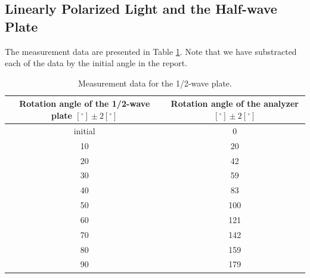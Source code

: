 \documentclass[a4paper]{article}
\begin{document}
\subsection{Linearly Polarized Light and the Half-wave Plate}

The measurement data are presented in Table \ref{table::1/2}. Note that we have substracted each of the data by the initial angle in the report.

\begin{table}[H]
	\centering
	\begin{tabular}{cc}
		\hline
		Rotation angle of the 1/2-wave plate $[^\circ] \pm 2[^\circ]$ & Rotation angle of the analyzer $[^\circ] \pm 2[^\circ]$ \\
		\hline
		initial                                                       & 0                                                       \\
		10                                                            & 20                                                      \\
		20                                                            & 42                                                      \\
		30                                                            & 59                                                      \\
		40                                                            & 83                                                      \\
		50                                                            & 100                                                     \\
		60                                                            & 121                                                     \\
		70                                                            & 142                                                     \\
		80                                                            & 159                                                     \\
		90                                                            & 179                                                     \\
		\hline
	\end{tabular}
	\caption{Measurement data for the 1/2-wave plate.}
	\label{table::1/2}
\end{table}
\end{document}
